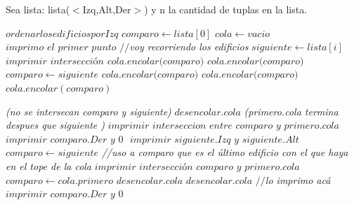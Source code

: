 \documentclass{article}
\begin{document}
Sea lista: lista($<$Izq,Alt,Der$>$) y n la cantidad de tuplas en la lista.


\vspace{0.4cm}
\begin{algorithmic}[1]
	\State $ordenar los edificios por Izq$
	\State $comparo\gets lista[0]$
	\State $cola\gets vacio$
	\State $\textit{imprimo el primer punto}$
	 \textit{$//$voy recorriendo los edificios}
		\State $siguiente\gets lista[i]$
				\State $\textit{imprimir intersección}$
					\State $\textit{cola.encolar(comparo)}$
				\Else
					\State$\textit{cola.encolar(comparo)}$						
					\EndIf			
				\EndIf
					\State $comparo\gets siguiente$
			\EndIf
					\State $\textit{cola.encolar(comparo)}$
				\Else
					\State$\textit{cola.encolar(comparo)}$
					\EndIf			
				\EndIf
			\EndIf
				\State $cola.encolar(comparo)$
			\EndIf
			
		\EndIf \textit{(no se intersecan comparo y siguiente\color{red}{*4})}
				\State $\textit{desencolar.cola}$
				\Else \textit{(primero.cola termina despues que siguiente \color{red}{*6})}
				\State $\textit{imprimir interseccion entre comparo y primero.cola}$
				\EndIf
			\EndWhile
		\State $\textit{imprimir comparo.Der y 0 }$
		\State $\textit{imprimir siguiente.Izq y siguiente.Alt}$
		\State $comparo\gets siguiente$
		\EndIf
	\textit{//uso a comparo que es el último edificio con el que haya en el tope de la cola}
		\State $\textit{imprimir intersección comparo y primero.cola}$
		\State $comparo\gets cola.primero$
		\State $desencolar.cola$
	\State $\textit{desencolar.cola}$
	\EndIf
	\newline
	\textit{$//$lo imprimo acá}
	\State $\textit{imprimir comparo.Der y 0}$
\EndProcedure
\end{algorithmic}
\end{document}
